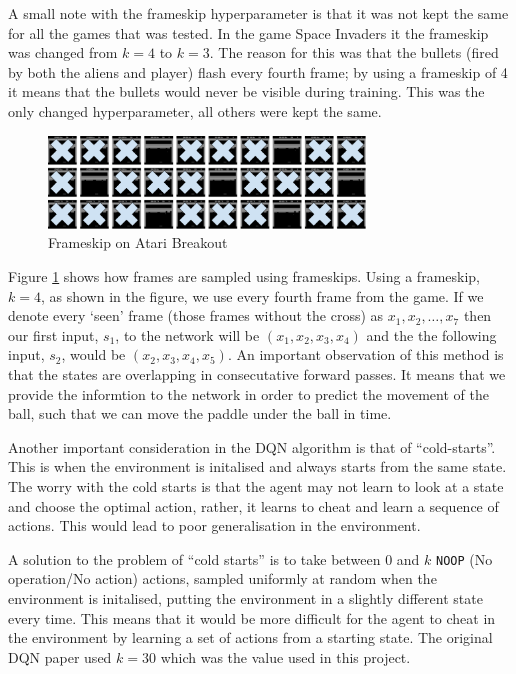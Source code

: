 A small note with the frameskip hyperparameter is that it was not kept the same for all the games that was tested. In the game Space Invaders it the frameskip was changed from $k = 4$ to $k = 3$. The reason for this was that the bullets (fired by both the aliens and player) flash every fourth frame; by using a frameskip of 4 it means that the bullets would never be visible during training. This was the only changed hyperparameter, all others were kept the same.

\begin{figure}[htbp]
	\centering
	\includegraphics[width=0.75\textwidth]{chapters/chapter4/images/frameskip.png}
	\caption{Frameskip on Atari Breakout
		\label{fig:frameskip}
	}
\end{figure}

Figure \ref{fig:frameskip} shows how frames are sampled using frameskips. Using a frameskip, $k = 4$, as shown in the figure, we use every fourth frame from the game. If we denote every `seen' frame (those frames without the cross) as $x_1, x_2, \hdots, x_7$ then our first input, $s_1$, to the network will be $(x_1, x_2, x_3, x_4)$ and the the following input, $s_2$, would be $(x_2, x_3, x_4, x_5)$. An important observation of this method is that the states are overlapping in consecutative forward passes. It means that we provide the informtion to the network in order to predict the movement of the ball, such that we can move the paddle under the ball in time.

Another important consideration in the DQN algorithm is that of ``cold-starts''. This is when the environment is initalised and always starts from the same state. The worry with the cold starts is that the agent may not learn to look at a state and choose the optimal action, rather, it learns to cheat and learn a sequence of actions. This would lead to poor generalisation in the environment.

A solution to the problem of ``cold starts'' is to take between 0 and $k$ \texttt{NOOP} (No operation/No action) actions, sampled uniformly at random when the environment is initalised, putting the  environment in a slightly different state every time. This means that it would be more difficult for the agent to cheat in the environment by learning a set of actions from a starting state. The original DQN paper \cite{dqn} used $k = 30$ which was the value used in this project.

